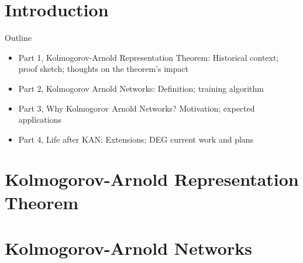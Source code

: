 \documentclass[10pt, aspectratio=169]{beamer}
\newcommand{\strong}[1]{\textcolor{umBlueLighter}{#1}}
\begin{document}
\section*{Introduction}

\begin{frame}{Outline}
  \begin{itemize}
    \setlength{\itemsep}{12pt}
  \item \strong{Part 1, Kolmogorov-Arnold Representation Theorem:}
    Historical context; proof sketch; thoughts on the theorem's impact
  \item \strong{Part 2, Kolmogorov Arnold Networks:}
    Definition; training algorithm
  \item \strong{Part 3, Why Kolmogorov Arnold Networks?}
    Motivation; expected applications
  \item \strong{Part 4, Life after KAN:}
    Extensions; DEG current work and plans
  \end{itemize}
\end{frame}

\setcounter{section}{0}

\section{Kolmogorov-Arnold Representation Theorem}
{
  \begin{frame}
    \sectionpage%
  \end{frame}
}

%
%



%


\section{Kolmogorov-Arnold Networks}
{
  \begin{frame}
    \sectionpage%
  \end{frame}
}
\end{document}
